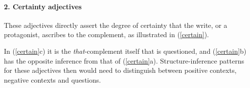 \documentclass[10pt]{article}
\begin{document}


\vspace{-.1in}
\paragraph{2. Certainty  adjectives} These adjectives directly assert the degree of certainty that the write, or a protagonist, ascribes to the complement, as illustrated in (\ref{certain}).

\vspace{-0.5em}
 \vspace{-0.5em} In (\ref{certain}c) it is the
 \textit{that}-complement itself that is questioned, and
 (\ref{certain}b) has the opposite inference from that of
 (\ref{certain}a).  Structure-inference patterns for these adjectives
 then would need to distinguish between positive contexts, negative
 contexts and questions.
\end{document}
